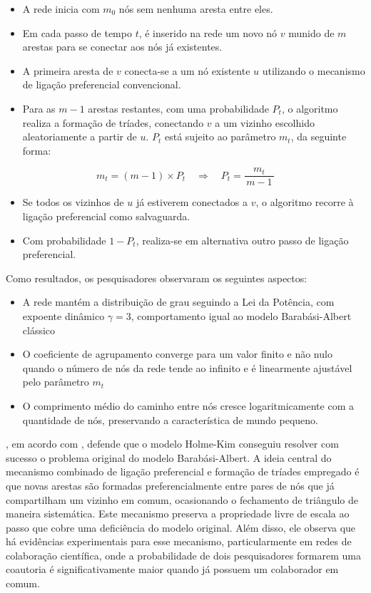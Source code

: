\documentclass[12pt,oneside,a4paper,brazil,sumario=tradicional]{abntex2}
\begin{document}
\begin{itemize}
  \item A rede inicia com $m_{0}$ nós sem nenhuma aresta entre eles.
  \item Em cada passo de tempo $t$, é inserido na rede um novo nó $v$ munido de $m$ arestas para se conectar aos nós já existentes.
  \item A primeira aresta de $v$ conecta-se a um nó existente $u$ utilizando o mecanismo de ligação preferencial convencional.
  \item Para as $m - 1$ arestas restantes, com uma probabilidade $P_{t}$, o algoritmo realiza a formação de tríades, conectando $v$ a um vizinho escolhido aleatoriamente a partir de $u$. $P_{t}$ está sujeito ao parâmetro $m_{t}$, da seguinte forma:
\end{itemize}
\[m_{t} = (m-1)\times P_{t} \quad\Longrightarrow\quad P_{t} = \frac{m_{t}}{\,m-1\,}\]

\begin{itemize}
  \item Se todos os vizinhos de $u$ já estiverem conectados a $v$, o algoritmo recorre à ligação preferencial como salvaguarda.
  \item Com probabilidade $1 - P_{t}$, realiza-se em alternativa outro passo de ligação preferencial.
\end{itemize}
Como resultados, os pesquisadores observaram os seguintes aspectos:

\begin{itemize}
  \item A rede mantém a distribuição de grau seguindo a Lei da Potência, com expoente dinâmico $\gamma = 3$, comportamento igual ao modelo Barabási-Albert clássico
  \item O coeficiente de agrupamento converge para um valor finito e não nulo quando o número de nós da rede tende ao infinito e é linearmente ajustável pelo parâmetro $m_{t}$
  \item O comprimento médio do caminho entre nós cresce logaritmicamente com a quantidade de nós, preservando a característica de mundo pequeno.
\end{itemize}
, em acordo com , defende que o modelo Holme-Kim conseguiu resolver com sucesso o problema original do modelo Barabási-Albert. A ideia central do mecanismo combinado de ligação preferencial e formação de tríades empregado é que novas arestas são formadas preferencialmente entre pares de nós que já compartilham um vizinho em comum, ocasionando o fechamento de triângulo de maneira sistemática. Este mecanismo preserva a propriedade livre de escala ao passo que cobre uma deficiência do modelo original. Além disso, ele observa que há evidências experimentais para esse mecanismo, particularmente em redes de colaboração científica, onde a probabilidade de dois pesquisadores formarem uma coautoria é significativamente maior quando já possuem um colaborador em comum.
\end{document}
